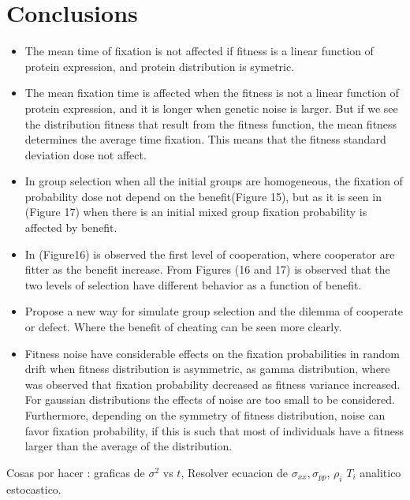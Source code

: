 \def\baselinestretch{1}
\chapter{Conclusions}
\ifpdf
    \graphicspath{{Conclusions/ConclusionsFigs/PNG/}{Conclusions/ConclusionsFigs/PDF/}{Conclusions/ConclusionsFigs/}}
\else
    \graphicspath{{Conclusions/ConclusionsFigs/EPS/}{Conclusions/ConclusionsFigs/}}
\fi

\def\baselinestretch{1.66}


 \begin{itemize}
             \item The mean time of fixation is not affected if fitness is a linear function of protein expression, and protein distribution is symetric.
             \item The mean fixation time is affected when the fitness is not a linear function of protein expression, and it is longer when genetic noise is larger. But if we see the distribution fitness that result from the fitness function, the mean fitness determines the average time fixation. This means that the fitness standard deviation dose not affect.
             \item  In group selection when all the initial groups are homogeneous, the fixation of probability dose not depend on the benefit(Figure 15), but as it is seen in (Figure 17) when there is an initial mixed group fixation probability is affected by benefit. 
             \item  In (Figure16) is observed the first level of cooperation, where cooperator are fitter as the benefit increase. From Figures (16 and 17) is observed that the two levels of selection have different behavior  as a function of benefit.   
             \item Propose   a new way for simulate group selection and the dilemma of cooperate or defect. Where the benefit of cheating can be seen more clearly.     
             \item Fitness noise have considerable effects on the fixation probabilities in random drift when fitness distribution is asymmetric, as gamma distribution, where was observed that fixation probability decreased as  fitness variance increased.  For gaussian distributions the effects of noise are too small to be considered. Furthermore, depending on the symmetry  of fitness distribution, noise can favor fixation probability, if this is such that most of individuals have a fitness larger than the average of the distribution. 
              \end{itemize}

Cosas por hacer : graficas de $\sigma^{2}$ vs $t$, Resolver ecuacion de $\sigma_{xx}, \sigma_{pp}$, $\rho_{i}$ $T_{i}$ analitico estocastico.


